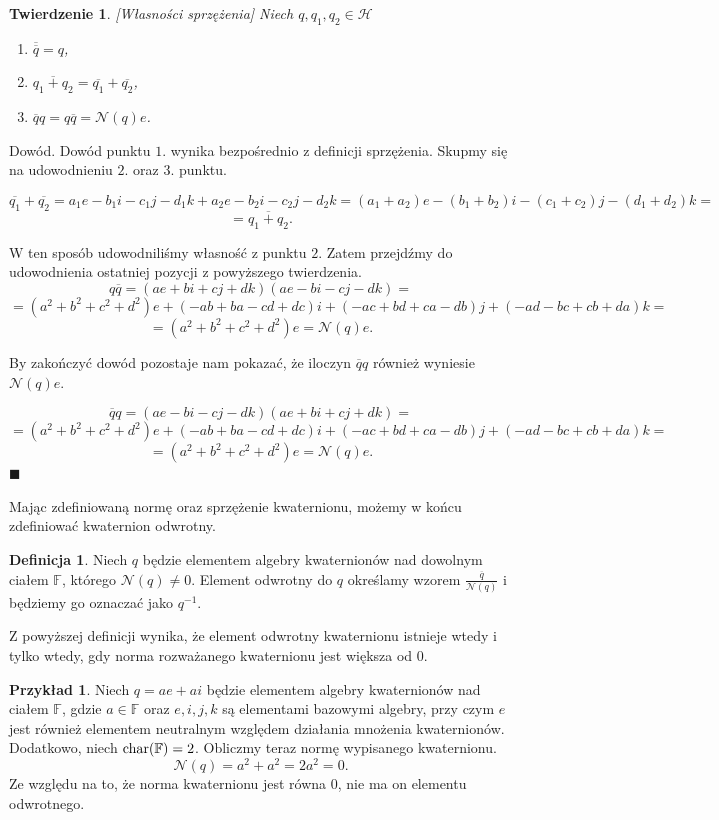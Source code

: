 \documentclass[a4paper,twoside,11pt,reqno]{mwrep}
\theoremstyle{plain} \newtheorem{twr}{Twierdzenie}
\theoremstyle{plain} \newtheorem{lem}{Lemat}
\theoremstyle{definition} \newtheorem{defi}{Definicja}
\theoremstyle{remark} \newtheorem*{wni}{Wniosek}
\theoremstyle{definition} \newtheorem{uwaga}{Uwaga}
\theoremstyle{definition}\newtheorem{prz}{Przykład}
\newenvironment{dowod}{\par\vspace{0.1cm}\par{\sc Dowód.}}{\hfill $\blacksquare$\par\vspace{0.4cm}\par}
\begin{document}
\begin{twr}\label{SprzężenieWłasności}[Własności sprzężenia]
Niech $q,q_1,q_2 \in \mathcal{H}$
\begin{enumerate}
\item $\overline{\overline{q}} = q$,
\item $\overline{q_1+q_2} = \overline{q_1}+\overline{q_2}$,
\item $\overline{q}q= q\overline{q}=\mathcal{N}(q)e$.
\end{enumerate}

\end{twr}


\begin{dowod}
Dowód punktu $\mathit{1}.$ wynika bezpośrednio z definicji sprzężenia. Skupmy się na
udowodnieniu $\mathit{2}.$ oraz $\mathit{3}.$ punktu.

$$\overline{q_1}+\overline{q_2} = a_1e-b_1i-c_1j-d_1k+a_2e-b_2i-c_2j-d_2k =
(a_1+a_2)e-(b_1+b_2)i-(c_1+c_2)j-(d_1+d_2)k =$$
$$=\overline{q_1+q_2}.$$

W ten sposób udowodniliśmy własność z punktu  $\mathit{2}.$ 
Zatem przejdźmy do udowodnienia ostatniej pozycji z powyższego twierdzenia. 
$$q\overline{q}= (ae+bi+cj+dk)(ae-bi-cj-dk) =$$
$$= (a^2+b^2+c^2+d^2)e
+(-ab+ba-cd+dc)i+(-ac+bd+ca-db)j+(-ad-bc+cb+da)k  =$$
$$=(a^2+b^2+c^2+d^2)e = \mathcal{N}(q)e.$$

By zakończyć dowód pozostaje nam pokazać, że iloczyn $\overline{q}q$ również wyniesie 
$\mathcal{N}(q)e$.

$$\overline{q}q= (ae-bi-cj-dk)(ae+bi+cj+dk) =$$
$$= (a^2+b^2+c^2+d^2)e
+(-ab+ba-cd+dc)i+(-ac+bd+ca-db)j+(-ad-bc+cb+da)k  =$$
$$=(a^2+b^2+c^2+d^2)e = \mathcal{N}(q)e.$$
\end{dowod}

Mając zdefiniowaną normę oraz sprzężenie kwaternionu, możemy w końcu zdefiniować kwaternion odwrotny.

\begin{defi}
Niech $q$ będzie elementem algebry kwaternionów nad dowolnym ciałem 
$\mathbb{F}$, którego $\mathcal{N}(q) \neq 0 $. Element odwrotny do $q$ określamy wzorem
$\frac{\overline{q}}{\mathcal{N}(q)}$ i będziemy go oznaczać jako $q^{-1}$.
\end{defi}

Z powyższej definicji wynika, że element odwrotny kwaternionu istnieje wtedy i tylko wtedy, gdy
norma rozważanego kwaternionu jest większa od $0$.

\begin{prz}
Niech $q  = ae+ai$ będzie elementem algebry kwaternionów nad ciałem 
$\mathbb{F}$, gdzie $a\in\mathbb{F}$ oraz $e,i,j,k$ są elementami bazowymi algebry, 
przy czym  $e$ jest również elementem neutralnym względem działania mnożenia kwaternionów.
Dodatkowo, niech $\textup{char}(\mathbb{F})=2$. Obliczmy teraz normę wypisanego kwaternionu.
$$\mathcal{N}(q) = a^2 +a^2 = 2a^2 = 0.$$
Ze względu na to, że norma kwaternionu jest równa $0$, nie ma on elementu odwrotnego.
\end{prz}
\end{document}
